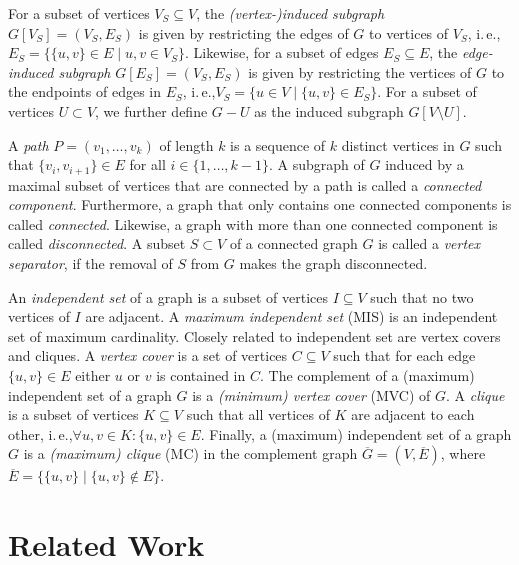 \documentclass[a4paper,UKenglish,cleveref, autoref, thm-restate]{lipics-v2021}
\newcommand{\ie}{i.\,e.,\xspace}
\begin{document}
For a subset of vertices $V_S \subseteq V$, the \emph{(vertex-)induced subgraph}
$G[V_S] = (V_S, E_S)$ is given by restricting the edges of $G$ to vertices of $V_S$, \ie $E_S = \{\{u,v\} \in E \mid u,v \in V_S\}$.
Likewise, for a subset of edges $E_S \subseteq E$, the \emph{edge-induced
  subgraph} $G[E_S] = (V_S, E_S)$ is given by restricting the vertices of $G$ to the endpoints of edges in $E_S$, \ie $V_S = \{u \in V \mid \{u,v\} \in E_S\}$.
  For a subset of vertices $U \subset V$, we further define $G - U$ as the induced subgraph $G[V \setminus U]$.

A \emph{path} $P=(v_1, \ldots, v_k)$ of length $k$ is a sequence of $k$ distinct vertices in $G$ such that $\{v_i, v_{i+1}\} \in E$ for all $i \in \{1, \ldots, k-1\}$.
A subgraph of $G$ induced by a maximal subset of vertices that are connected by a path is called a \emph{connected component}.
Furthermore, a graph that only contains one connected components is called \emph{connected}.
Likewise, a graph with more than one connected component is called \emph{disconnected}.
A subset $S \subset V$ of a connected graph $G$ is called a \emph{vertex separator}, if the removal of $S$ from $G$ makes the graph disconnected.

An \emph{independent set} of a graph is a subset of vertices $I \subseteq V$ such that no two vertices of $I$ are adjacent. 
A \emph{maximum independent set} (MIS) is an independent set of maximum cardinality.
Closely related to independent set are vertex covers and cliques.
A \emph{vertex cover} is a set of vertices $C \subseteq V$ such that for each edge $\{u,v\} \in E$ either $u$ or $v$ is contained in $C$.
The complement of a (maximum) independent set of a graph $G$ is a \emph{(minimum) vertex cover} (MVC) of $G$.
A \emph{clique} is a subset of vertices $K \subseteq V$ such that all vertices of $K$ are adjacent to each other, \ie $\forall u,v \in K: \{u,v\} \in E$.
Finally, a (maximum) independent set of a graph $G$ is a \emph{(maximum) clique} (MC) in the complement graph $\overline{G} = (V, \overline{E})$, where $\overline{E} = \{\{u,v\} \mid \{u,v\} \not\in E\}$.

\section{Related Work}
\end{document}
